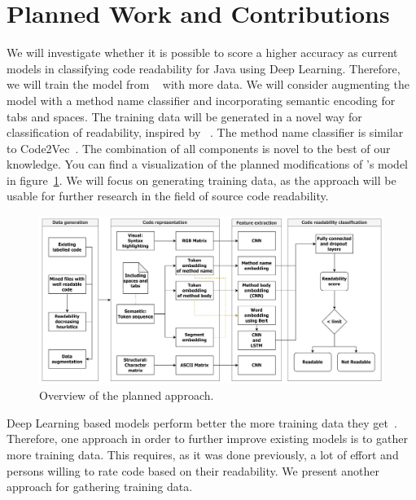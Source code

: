 \documentclass[%
class=scrreprt,
chapterprefix=false,%
open=right,%
twoside=false,%
paper=a4,%
logofile={Logo\_zentral\_farbig\_EN.png},%
thesistype=masterproposal,%
UKenglish,%
]{se2thesis}
\begin{document}
	\section{Planned Work and Contributions} \label{Planned Work and Contributions}
	We will investigate whether it is possible to score a higher accuracy as current models in classifying code readability for Java using Deep Learning. Therefore, we will train the model from \citeauthor{mi2022towards}~\cite{mi2022towards} with more data. We will consider augmenting the model with a method name classifier and incorporating semantic encoding for tabs and spaces. The training data will be generated in a novel way for classification of readability, inspired by \citeauthor{loriot2022styler}~\cite{loriot2022styler}. The method name classifier is similar to Code2Vec~\cite{alon2019code2vec}. The combination of all components is novel to the best of our knowledge. You can find a visualization of the planned modifications of \citeauthor{mi2022towards}'s model in figure~\ref{fig:model_pipeline}. We will focus on generating training data, as the approach will be usable for further research in the field of source code readability.\\
	
	\begin{figure}[t]
		\centering
		\includegraphics[width=\textwidth]{Model_pipeline.png}
		\caption{Overview of the planned approach.}
		\label{fig:model_pipeline}
	\end{figure}
	
	Deep Learning based models perform better the more training data they get~\cite{hestness2017deep}. Therefore, one approach in order to further improve existing models is to gather more training data.
	This requires, as it was done previously, a lot of effort and persons willing to rate code based on their readability. We present another approach for gathering training data.
	
\end{document}
